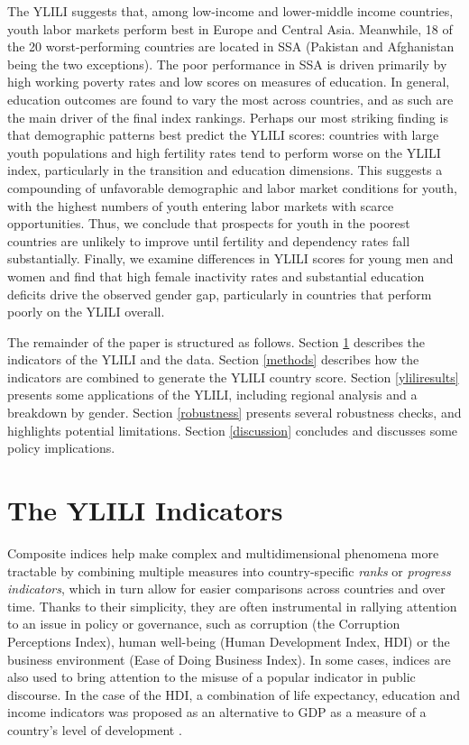 \documentclass[
  a4paper, twoside, 12pt]{book}
\begin{document}
The YLILI suggests that, among low-income and lower-middle income countries, youth labor markets perform best in Europe and Central Asia. Meanwhile, 18 of the 20 worst-performing countries are located in SSA (Pakistan and Afghanistan being the two exceptions). The poor performance in SSA is driven primarily by high working poverty rates and low scores on measures of education. In general, education outcomes are found to vary the most across countries, and as such are the main driver of the final index rankings. Perhaps our most striking finding is that demographic patterns best predict the YLILI scores: countries with large youth populations and high fertility rates tend to perform worse on the YLILI index, particularly in the transition and education dimensions. This suggests a compounding of unfavorable demographic and labor market conditions for youth, with the highest numbers of youth entering labor markets with scarce opportunities. Thus, we conclude that prospects for youth in the poorest countries are unlikely to improve until fertility and dependency rates fall substantially. Finally, we examine differences in YLILI scores for young men and women and find that high female inactivity rates and substantial education deficits drive the observed gender gap, particularly in countries that perform poorly on the YLILI overall.

The remainder of the paper is structured as follows. Section \ref{indicators} describes the indicators of the YLILI and the data. Section \ref{methods} describes how the indicators are combined to generate the YLILI country score. Section \ref{yliliresults} presents some applications of the YLILI, including regional analysis and a breakdown by gender. Section \ref{robustness} presents several robustness checks, and highlights potential limitations. Section \ref{discussion} concludes and discusses some policy implications.

\hypertarget{indicators}{%
\section{The YLILI Indicators}\label{indicators}}

Composite indices help make complex and multidimensional phenomena more tractable by combining multiple measures into country-specific \emph{ranks} or \emph{progress indicators}, which in turn allow for easier comparisons across countries and over time. Thanks to their simplicity, they are often instrumental in rallying attention to an issue in policy or governance, such as corruption (the Corruption Perceptions Index), human well-being (Human Development Index, HDI) or the business environment (Ease of Doing Business Index). In some cases, indices are also used to bring attention to the misuse of a popular indicator in public discourse. In the case of the HDI, a combination of life expectancy, education and income indicators was proposed as an alternative to GDP as a measure of a country's level of development \autocite{undp1990}.
\end{document}
